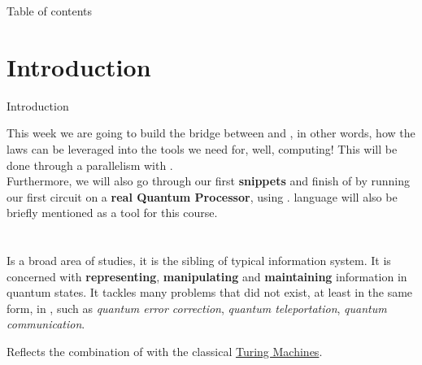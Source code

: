 \documentclass[aspectratio=43]{beamer}
\title{\qis}
\begin{document}
\begin{frame}
	\titlepage
\end{frame}


\begin{frame}{Table of contents}
	\begin{card}
		\tableofcontents
	\end{card}
\end{frame}


\section{Introduction}
\begin{frame}{Introduction}
    \begin{card}
    This week we are going to build the bridge between \textbf{\qm} and \textbf{\qc}, in other words, how the \q laws can be leveraged into the tools we need for, well, computing! This will be done through a parallelism with \cc. \\
    Furthermore, we will also go through our first \textbf{\qk snippets} and finish of by running our first \q circuit on a \textbf{real Quantum Processor}, using \ibmqe. \qasm language will also be briefly mentioned as a tool for this course. 
    \end{card}
\pagenumber
\end{frame}

\section{\qis}
\begin{frame}{\qis}
    \begin{card}
    Is a broad area of studies, it is the \q sibling of typical information system. It is concerned with \textbf{representing}, \textbf{manipulating} and \textbf{maintaining} information in quantum states. It tackles many problems that did not exist, at least in the same form, in \cc, such as \textit{quantum error correction}, \textit{quantum teleportation}, \textit{quantum communication}.
    \end{card}
    \begin{card}
    Reflects the combination of \qm with the classical \href{http://mathworld.wolfram.com/TuringMachine.html}{Turing Machines}.
    \end{card}
\pagenumber
\end{frame}
\end{document}
